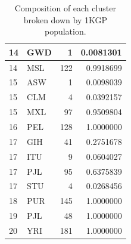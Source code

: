 \begin{table}[ht]
{\begin{tabular}{l|l|r|r}
14 & GWD & 1 & 0.0081301\\
\hline
14 & MSL & 122 & 0.9918699\\
\hline
15 & ASW & 1 & 0.0098039\\
\hline
15 & CLM & 4 & 0.0392157\\
\hline
15 & MXL & 97 & 0.9509804\\
\hline
16 & PEL & 128 & 1.0000000\\
\hline
17 & GIH & 41 & 0.2751678\\
\hline
17 & ITU & 9 & 0.0604027\\
\hline
17 & PJL & 95 & 0.6375839\\
\hline
17 & STU & 4 & 0.0268456\\
\hline
18 & PUR & 145 & 1.0000000\\
\hline
19 & PJL & 48 & 1.0000000\\
\hline
20 & YRI & 181 & 1.0000000\\
\hline
\end{tabular}}
\caption[Composition of each cluster broken down by 1KGP population]{Composition of each cluster broken down by 1KGP population.}
\label{table:1kgp_populations} 
\end{table} 

